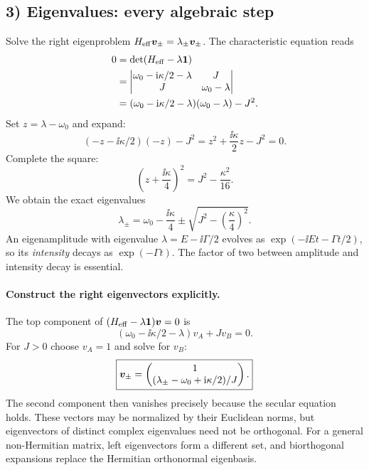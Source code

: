 \subsection*{3) Eigenvalues: every algebraic step}
Solve the right eigenproblem
$H_{\mathrm{eff}}\bm{v}_\pm=\lambda_\pm\bm{v}_\pm$.
The characteristic equation reads
\begin{align}
0&=\det(H_{\mathrm{eff}}-\lambda \mathbf1)\notag\\
 &=\begin{vmatrix}
 \omega_0-\mathrm{i}\kappa/2-\lambda&J\\
 J&\omega_0-\lambda
 \end{vmatrix}\notag\\
 &=(\omega_0-\mathrm{i}\kappa/2-\lambda)
   (\omega_0-\lambda)-J^2.
\end{align}
Set $z=\lambda-\omega_0$ and expand:
\begin{equation}
(-z-\ii\kappa/2)(-z)-J^2
=z^2+\frac{\ii\kappa}{2}z-J^2=0.
\end{equation}
Complete the square:
\begin{equation}
\left(z+\frac{\ii\kappa}{4}\right)^2
=J^2-\frac{\kappa^2}{16}.
\end{equation}
We obtain the exact eigenvalues
\begin{equation}
\boxed{\lambda_\pm=\omega_0-\frac{\ii\kappa}{4}
 \pm\sqrt{J^2-\left(\frac{\kappa}{4}\right)^2}.}
\label{eq:nh-complex-spectrum}
\end{equation}
An eigenamplitude with eigenvalue
$\lambda=E-\ii\Gamma/2$ evolves as
$\exp(-\ii Et-\Gamma t/2)$, so its \emph{intensity}
decays as $\exp(-\Gamma t)$. The factor of two between
amplitude and intensity decay is essential.

\paragraph{Construct the right eigenvectors explicitly.}
The top component of $(H_{\mathrm{eff}}-\lambda \mathbf1)\bm{v}=0$
is
\begin{equation}
(\omega_0-\ii\kappa/2-\lambda)v_A+Jv_B=0.
\end{equation}
For $J>0$ choose $v_A=1$ and solve for $v_B$:
\begin{equation}
\boxed{\bm{v}_\pm=
\begin{pmatrix}
1\\(\lambda_\pm-\omega_0+\mathrm{i}\kappa/2)/J
\end{pmatrix}.}
\label{eq:nh-right-vectors}
\end{equation}
The second component then vanishes precisely because the
secular equation holds. These vectors may be normalized by
their Euclidean norms, but eigenvectors of distinct complex
eigenvalues need not be orthogonal. For a general non-Hermitian
matrix, left eigenvectors form a different set, and
biorthogonal expansions replace the Hermitian orthonormal
eigenbasis.

